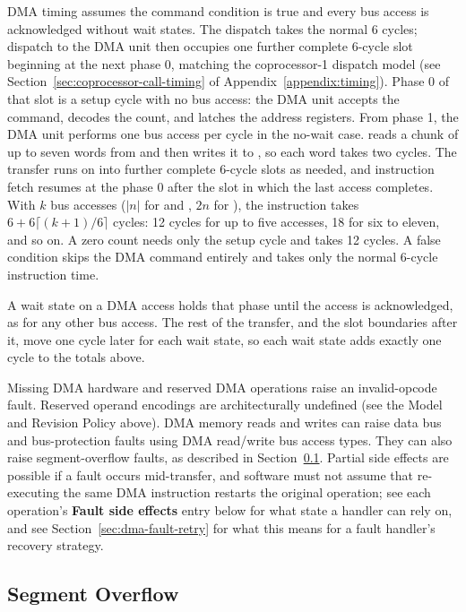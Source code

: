 \noindent DMA timing assumes the command condition is true and every bus access is acknowledged without wait states. The
 dispatch takes the normal 6 cycles; dispatch to the DMA unit then occupies one further complete 6-cycle
slot beginning at the next phase 0, matching the coprocessor-1 dispatch model (see Section~\ref{sec:coprocessor-call-timing} of Appendix~\ref{appendix:timing}).
Phase 0 of that slot is a setup cycle with no bus access: the DMA unit accepts the command, decodes the count, and
latches the address registers. From phase 1, the DMA unit performs one bus access per cycle in the no-wait case.
 reads a chunk of up to seven words from  and then writes it to , so each word takes
two cycles. The transfer
runs on into further complete 6-cycle slots as needed, and instruction fetch resumes at the phase 0 after the slot in
which the last access completes. With $k$ bus accesses ($|n|$ for  and , $2n$ for
), the instruction takes $6 + 6\lceil (k + 1)/6 \rceil$ cycles: 12 cycles for up to five accesses, 18 for six
to eleven, and so on. A zero count needs only the setup cycle and takes 12 cycles. A false condition skips the DMA
command entirely and takes only the normal 6-cycle  instruction time.

\noindent A wait state on a DMA access holds that phase until the access is acknowledged, as for any other bus access.
The rest of the transfer, and the slot boundaries after it, move one cycle later for each wait state, so each wait
state adds exactly one cycle to the totals above.

\noindent Missing DMA hardware and reserved DMA operations raise an invalid-opcode fault. Reserved operand
encodings are architecturally undefined (see the Model and Revision Policy above). DMA memory reads and writes can
raise data bus and bus-protection faults using DMA read/write bus access
types. They can also raise segment-overflow faults, as described in Section~\ref{sec:dma-segment-overflow}. Partial side effects are possible if a fault
occurs mid-transfer, and software must not assume that re-executing the same DMA instruction restarts the original
operation; see each operation's \textbf{Fault side effects} entry below for what state a handler can rely on, and see
Section~\ref{sec:dma-fault-retry} for what this means for a fault handler's recovery strategy.

\subsection{Segment Overflow}
\label{sec:dma-segment-overflow}

